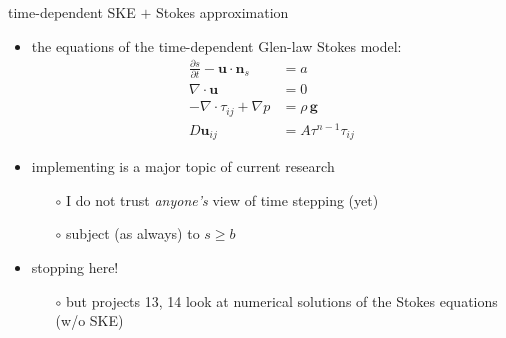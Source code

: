 \documentclass[10pt,dvipsnames]{beamer}
\begin{document}
\begin{frame}{time-dependent SKE $+$ Stokes approximation}

\begin{itemize}
\item the equations of the \alert{time-dependent Glen-law Stokes model}:
\begin{align*}
\frac{\partial s}{\partial t} - \mathbf{u} \cdot \mathbf{n}_s &= a \\
\nabla \cdot \mathbf{u} &= 0 \\
-\nabla \cdot \tau_{ij} + \nabla p &= \rho\, \bm{g} \\
D\mathbf{u}_{ij} &= A \tau^{n-1} \tau_{ij}
\end{align*}
\item implementing is a major topic of current research
  \begin{itemize}
  \item[$\circ$] I do not trust \emph{anyone's} view of time stepping (yet)
  \item[$\circ$] subject (as always) to \alert{$s \ge b$}
  \end{itemize}
\item stopping here!
  \begin{itemize}
  \item[$\circ$] but projects 13, 14 look at numerical solutions of the Stokes equations (w/o SKE)
  \end{itemize}
\end{itemize}
\end{frame}
\end{document}
